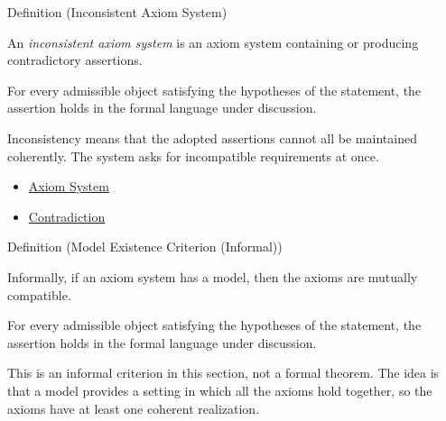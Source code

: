 \begin{definitionbox}{Definition (Inconsistent Axiom System)}
\begin{definition}
\label{def:axiom-systems-inconsistent-axiom-system}
An \emph{inconsistent axiom system} is an axiom system containing or producing
contradictory assertions.
\end{definition}
\end{definitionbox}
\begin{remark*}
For every admissible object satisfying the hypotheses of the statement, the
assertion holds in the formal language under discussion.
\end{remark*}


\begin{remark*}[Interpretation]
Inconsistency means that the adopted assertions cannot all be maintained
coherently. The system asks for incompatible requirements at once.
\end{remark*}

\begin{dependencies}
\begin{itemize}
  \item \hyperref[def:axiom-system]{Axiom System}
  \item \hyperref[def:axiom-systems-contradiction]{Contradiction}
\end{itemize}
\end{dependencies}

\begin{definitionbox}{Definition (Model Existence Criterion (Informal))}
\begin{definition}
\label{def:axiom-systems-model-existence-criterion}
Informally, if an axiom system has a model, then the axioms are mutually
compatible.
\end{definition}
\end{definitionbox}
\begin{remark*}
For every admissible object satisfying the hypotheses of the statement, the
assertion holds in the formal language under discussion.
\end{remark*}


\begin{remark*}[Interpretation]
This is an informal criterion in this section, not a formal theorem. The idea
is that a model provides a setting in which all the axioms hold together, so
the axioms have at least one coherent realization.
\end{remark*}

